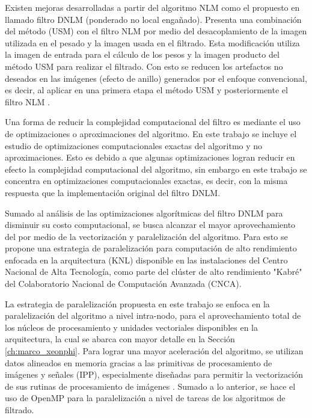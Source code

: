 Existen mejoras desarrolladas a partir del algoritmo NLM como el propuesto en \cite{calderon2015dewaff} llamado filtro DNLM  (ponderado no local enga\~nado). Presenta una combinaci\'on del m\'etodo  (USM) con el filtro NLM por medio del desacoplamiento de la imagen utilizada en el pesado y la imagen usada en el filtrado. Esta modificaci\'on utiliza la imagen de entrada para el c\'alculo de los pesos y la imagen producto del m\'etodo USM para realizar el filtrado. Con esto se reducen los artefactos no deseados en las im\'agenes (efecto de anillo) generados por el enfoque convencional, es decir, al aplicar en una primera etapa el m\'etodo USM y posteriormente el filtro NLM \cite{calderon2015dewaff}.  


Una forma de reducir la complejidad computacional del filtro es mediante el uso de optimizaciones o aproximaciones del algoritmo. En este trabajo se incluye el estudio de optimizaciones computacionales exactas del algoritmo y no aproximaciones. Esto es debido a que algunas optimizaciones logran reducir en efecto la complejidad computacional del algoritmo, sin embargo en este trabajo se concentra en optimizaciones computacionales exactas, es decir, con la misma respuesta que la implementaci\'on original del filtro DNLM. 

Sumado al an\'alisis de las optimizaciones algor\'itmicas del filtro DNLM para disminuir su costo computacional, se busca alcanzar el mayor aprovechamiento del  por medio de la vectorizaci\'on y paralelizaci\'on del algoritmo. Para esto se propone una estrategia de paralelizaci\'on para computaci\'on de alto rendimiento enfocada en la arquitectura  (KNL) disponible en las instalaciones del Centro Nacional de Alta Tecnolog\'ia, como parte del cl\'uster de alto rendimiento "Kabr\'e" del Colaboratorio Nacional de Computaci\'on Avanzada (CNCA).

La estrategia de paralelizaci\'on propuesta en este trabajo se enfoca en la paralelizaci\'on del algoritmo a nivel intra-nodo, para el aprovechamiento total de los n\'ucleos de procesamiento y unidades vectoriales disponibles en la arquitectura, la cual se abarca con mayor detalle en la Secci\'on \ref{ch:marco_xeonphi}. 
Para lograr una mayor aceleraci\'on del algoritmo, se utilizan datos alineados en memoria gracias a las primitivas de procesamiento de im\'agenes y se\~nales  (IPP), especialmente dise\~nadas para permitir la vectorizaci\'on de sus rutinas de procesamiento de im\'agenes \cite{IntelCorporation2017}. Sumado a lo anterior, se hace el uso de OpenMP para la paralelizaci\'on a nivel de tareas de los algoritmos de filtrado. 

